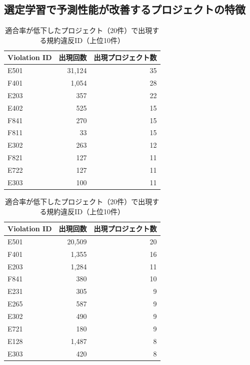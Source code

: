 \documentclass[11pt]{jreport}
\begin{document}
\subsection{選定学習で予測性能が改善するプロジェクトの特徴}

\begin{table}[ht]
    \centering
    \caption{適合率が改善したプロジェクト（37件）で出現する規約違反ID（上位10件）}
    \label{tab:improve_precision_id}
    \small
    \begin{tabular}{lrr}
      \hline
      Violation ID & 出現回数 & 出現プロジェクト数 \\ \hline
      E501 & 31,124 & 35 \\
      F401 & 1,054 & 28 \\
      E203 & 357 & 22 \\
      E402 & 525 & 15 \\
      F841 & 270 & 15 \\
      F811 & 33 & 15 \\
      E302 & 263 & 12 \\
      F821 & 127 & 11 \\
      E722 & 127 & 11 \\
      E303 & 100 & 11 \\ \hline
    \end{tabular}
    
    \vspace{2em} %
  
    \centering
    \caption{適合率が低下したプロジェクト（20件）で出現する規約違反ID（上位10件）}
    \label{tab:not_improve_precision_id}
    \small
    \begin{tabular}{lrr}
      \hline
      Violation ID & 出現回数 & 出現プロジェクト数 \\ \hline
      E501 & 20,509 & 20 \\
      F401 & 1,355 & 16 \\
      E203 & 1,284 & 11 \\
      F841 & 380 & 10 \\
      E231 & 305 & 9 \\
      E265 & 587 & 9 \\
      E302 & 490 & 9 \\
      E721 & 180 & 9 \\
      E128 & 1,487 & 8 \\
      E303 & 420 & 8 \\ \hline
    \end{tabular}
  \end{table}
\end{document}
